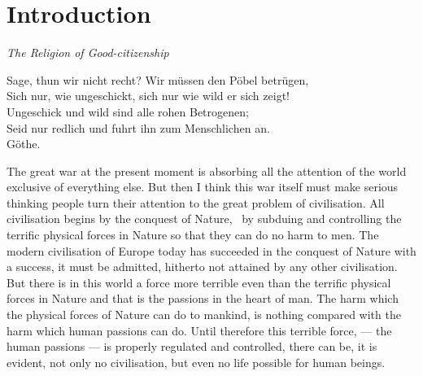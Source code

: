 \chapter{Introduction}
\begin{center}
    \emph{The Religion of Good-citizenship}
\end{center}
\begin{center}
   \scriptsize
   Sage, thun wir nicht recht? Wir m\"ussen den P\"obel betr\"ugen,\\
   Sich nur, wie ungeschickt, sich nur wie wild er sich zeigt!\\
   Ungeschick und wild sind alle rohen Betrogenen;\\
   Seid nur redlich und fuhrt ihn zum Menschlichen an.\cite{num11}\\
    \hfill G\"othe.
\end{center}

The great war at the present moment is absorbing all the attention of the world exclusive of everything else.
But then I think this war itself must make serious thinking people turn their attention to the great problem of civilisation.
All civilisation begins by the conquest of Nature, \ie\ by subduing and controlling the terrific physical forces in Nature so that they can do no harm to men.
The modern civilisation of Europe today has succeeded in the conquest of Nature with a success, it must be admitted, hitherto not attained by any other civilisation.
But there is in this world a force more terrible even than the terrific physical forces in Nature and that is the passions in the heart of man.
The harm which the physical forces of Nature can do to mankind, is nothing compared with the harm which human passions can do.
Until therefore this terrible force, --- the human passions --- is properly regulated and controlled, there can be, it is evident, not only no civilisation, but even no life possible for human beings.

